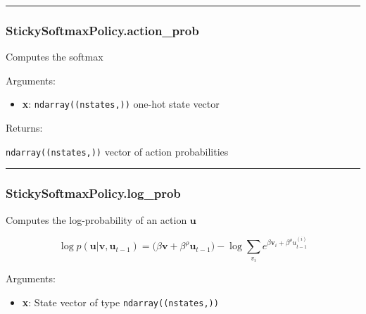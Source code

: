 \begin{center}\rule{0.5\linewidth}{\linethickness}\end{center}

\subsubsection{StickySoftmaxPolicy.action\_prob}\label{stickysoftmaxpolicy.action_prob}

\begin{Shaded}
\begin{Highlighting}[]
\end{Highlighting}
\end{Shaded}

Computes the softmax

Arguments:

\begin{itemize}
\tightlist
\item
  \textbf{x}: \texttt{ndarray((nstates,))} one-hot state vector
\end{itemize}

Returns:

\texttt{ndarray((nstates,))} vector of action probabilities

\begin{center}\rule{0.5\linewidth}{\linethickness}\end{center}

\subsubsection{StickySoftmaxPolicy.log\_prob}\label{stickysoftmaxpolicy.log_prob}

\begin{Shaded}
\begin{Highlighting}[]
\end{Highlighting}
\end{Shaded}

Computes the log-probability of an action \(\mathbf u\)

\[
\log p(\mathbf u|\mathbf v, \mathbf u_{t-1}) = \big(\beta \mathbf v + \beta^\rho \mathbf u_{t-1}) - \log \sum_{v_i} e^{\beta \mathbf v_i + \beta^\rho u_{t-1}^{(i)}}
\]

Arguments:

\begin{itemize}
\tightlist
\item
  \textbf{x}: State vector of type \texttt{ndarray((nstates,))}
\end{itemize}

